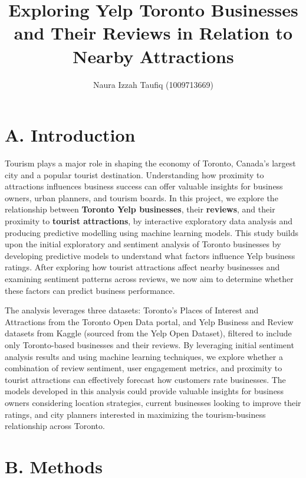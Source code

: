 \documentclass[
]{article}
\title{Exploring Yelp Toronto Businesses and Their Reviews in Relation
to Nearby Attractions}
\author{Naura Izzah Taufiq (1009713669)}
\date{}
\begin{document}
\pagestyle{fancy}

\maketitle

\section{A. Introduction}\label{a.-introduction}

Tourism plays a major role in shaping the economy of Toronto, Canada's
largest city and a popular tourist destination. Understanding how
proximity to attractions influences business success can offer valuable
insights for business owners, urban planners, and tourism boards. In
this project, we explore the relationship between \textbf{Toronto Yelp
businesses}, their \textbf{reviews}, and their proximity to
\textbf{tourist attractions}, by interactive exploratory data analysis
and producing predictive modelling using machine learning models. This
study builds upon the initial exploratory and sentiment analysis of
Toronto businesses by developing predictive models to understand what
factors influence Yelp business ratings. After exploring how tourist
attractions affect nearby businesses and examining sentiment patterns
across reviews, we now aim to determine whether these factors can
predict business performance.

The analysis leverages three datasets: Toronto's Places of Interest and
Attractions from the Toronto Open Data portal, and Yelp Business and
Review datasets from Kaggle (sourced from the Yelp Open Dataset),
filtered to include only Toronto-based businesses and their reviews. By
leveraging initial sentiment analysis results and using machine learning
techniques, we explore whether a combination of review sentiment, user
engagement metrics, and proximity to tourist attractions can effectively
forecast how customers rate businesses. The models developed in this
analysis could provide valuable insights for business owners considering
location strategies, current businesses looking to improve their
ratings, and city planners interested in maximizing the tourism-business
relationship across Toronto.

\section{B. Methods}\label{b.-methods}
\end{document}
